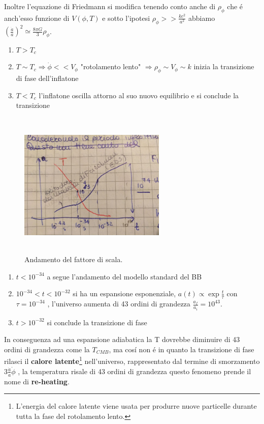 \documentclass[12pt, a4paper]{article}
\begin{document}
Inoltre l'equazione di Friedmann si modifica tenendo conto anche di $\rho_{\phi}$ che \'{e} anch'esso funzione di $V(\phi,T)$ e sotto l'ipotesi $\rho_{\phi}>>\frac{kc^2}{a^2}$ abbiamo $(\frac{\dot{a}}{a})^2\simeq \frac{8\pi G}{3}\rho_{\phi}$. 
\begin{enumerate}
\item $T>T_c$
\item $T\sim T_c \Rightarrow \dot{\phi} <<V_{\phi}$ "rotolamento lento" $\Rightarrow \rho_{\phi}\sim V_{\phi}\sim k$ inizia la transizione di fase dell'inflatone
\item $T<T_c$ l'inflatone oscilla attorno al suo nuovo equilibrio e si conclude la transizione
\end{enumerate}
\begin{figure}[htp]
    \centering
    \includegraphics[width=7cm, height=7cm]{images/scala.jpeg}
    \caption{Andamento del fattore di scala.}
    \label{fig:scala}
\end{figure}
\begin{enumerate}
\item $t<10^{-34}$ a segue l'andamento del modello standard del BB
\item $10^{-34}<t<10^{-32}$ si ha un espansione esponenziale, $a(t)\propto \exp{\frac{t}{\tau}}$ con $\tau=10^{-34}$ , l'universo aumenta di 43 ordini di grandezza $\frac{a_f}{a_i}=10^{43}$.
\item $t>10^{-32}$ si conclude la transizione di fase
\end{enumerate}
In conseguenza ad una espansione adiabatica la T dovrebbe diminuire di 43 ordini di grandezza come la $T_{CMB}$, ma cos\'{i} non \'{e} in quanto la transizione di fase rilasci il \textbf{calore latente}\footnote{L'energia del calore latente viene usata per produrre nuove particelle durante tutta la fase del rotolamento lento.} nell'universo, rappresentato dal termine di smorzamento $3\frac{\dot{a}}{a}\dot{\phi}$ , la temperatura risale di 43 ordini di grandezza questo fenomeno prende il nome di \textbf{re-heating}.
\end{document}

